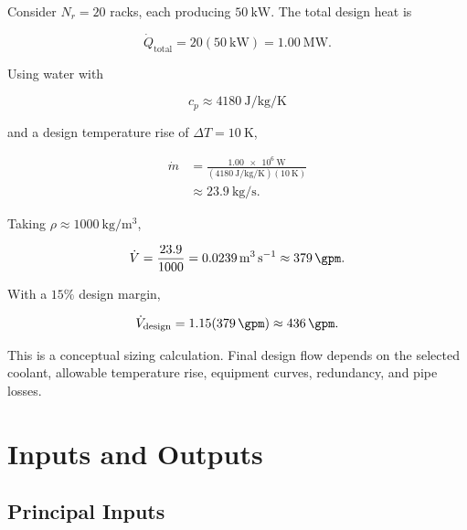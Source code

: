 \documentclass[11pt]{article}
\begin{document}
Consider \(N_r=20\) racks, each producing \(\SI{50}{\kilo\watt}\). The total
design heat is

\begin{equation}
\dot Q_{\mathrm{total}}
=20(\SI{50}{\kilo\watt})
=\SI{1.00}{\mega\watt}.
\end{equation}

Using water with

\begin{equation}
c_p\approx\SI{4180}{\joule\per\kilogram\per\kelvin}
\end{equation}

and a design temperature rise of \(\Delta T=\SI{10}{\kelvin}\),

\begin{align}
\dot m
&=\frac{\SI{1.00e6}{\watt}}
{(\SI{4180}{\joule\per\kilogram\per\kelvin})(\SI{10}{\kelvin})}\\
&\approx\SI{23.9}{\kilogram\per\second}.
\end{align}

Taking \(\rho\approx\SI{1000}{\kilogram\per\cubic\metre}\),

\begin{equation}
\dot V
=\frac{23.9}{1000}
=\SI{0.0239}{\cubic\metre\per\second}
\approx\SI{379}{\gpm}.
\end{equation}

With a \(15\%\) design margin,

\begin{equation}
\dot V_{\mathrm{design}}
=1.15(\SI{379}{\gpm})
\approx\SI{436}{\gpm}.
\end{equation}

This is a conceptual sizing calculation. Final design flow depends on the selected
coolant, allowable temperature rise, equipment curves, redundancy, and pipe losses.

\section{Inputs and Outputs}

\subsection{Principal Inputs}
\end{document}
